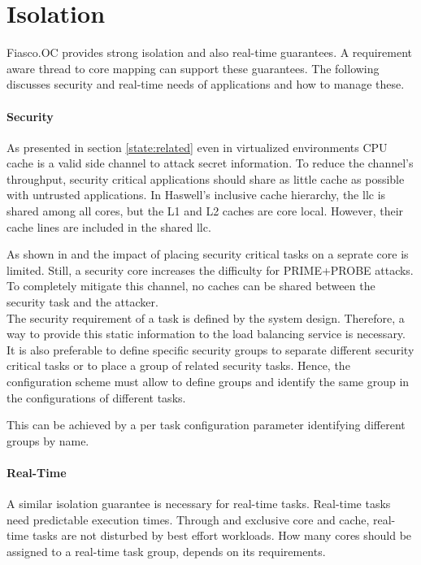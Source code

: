 \section{Isolation}
\label{design:isolation}

Fiasco.OC provides strong isolation and also real-time guarantees.
A requirement aware thread to core mapping can support these guarantees.
The following discusses security and real-time needs of applications and how to
manage these.

\paragraph{Security}
As presented in section \ref{state:related} even in virtualized environments
CPU cache is a valid side channel to attack secret information.
To reduce the channel's throughput, security critical applications should share
as little cache as possible with untrusted applications.
In Haswell's inclusive cache hierarchy, the \gls{llc} is shared among all
cores, but the L1 and L2 caches are core local.
However, their cache lines are included in the shared \gls{llc}.

As shown in \cite{inci_seriously_2015} and \cite{liu_last-level_2015}
the impact of placing security critical tasks on a seprate core is limited.
Still, a security core increases the difficulty for PRIME+PROBE attacks.
To completely mitigate this channel, no caches can be shared between the
security task and the attacker.
\\

The security requirement of a task is defined by the system design.
Therefore, a way to provide this static information to the load balancing
service is necessary.
It is also preferable to define specific security groups to separate different
security critical tasks or to place a group of related security tasks.
Hence, the configuration scheme must allow to define groups and identify the
same group in the configurations of different tasks.

This can be achieved by a per task configuration parameter identifying
different groups by name.


\paragraph{Real-Time}
A similar isolation guarantee is necessary for real-time tasks.
Real-time tasks need predictable execution times.
Through and exclusive core and cache, real-time tasks are not disturbed by best
effort workloads.
How many cores should be assigned to a real-time task group, depends on its
requirements.

